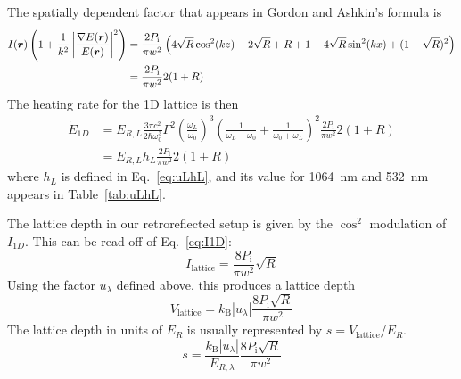 The spatially dependent factor that appears in Gordon and Ashkin's formula is
\begin{equation}
\begin{split}
   I(\bm{r}) 
  \left( 1 + \frac{1}{k^{2}}
    \left| 
   \frac{ \nabla E(\bm{r}) }
        {  E(\bm{r})} 
    \right|^{2} \right) & =  
   \frac{2 P_{\text{i}}}{\pi w^{2}} \left(
   4\sqrt{R}\cos^{2}(kz) - 2\sqrt{R} +R+1 
  + 
      4\sqrt{R} \sin^{2}(kx) +(1-\sqrt{R})^{2} 
  \right)  \\ 
   & =  
   \frac{2 P_{\text{i}}}{\pi w^{2}} 2 ( 1+R)
\end{split} 
\end{equation}
The heating rate for the 1D lattice is then
\begin{equation}
\begin{split}
  \dot{E}_{1D} & =  
   E_{R,L} 
   \frac{3\pi c^{2}}{2\hbar \omega_{0}^{3} } \Gamma^{2}
    \left( \frac{ \omega_{L} }{ \omega_{0}} \right)^{3} 
    \left(  \frac{1}{\omega_{L}-\omega_{0}} 
           + \frac{1}{\omega_{0} + \omega_{L}}  \right)^{2} 
   \frac{2 P_{\text{i}}}{\pi w^{2}} 2 ( 1+R) \\
    & = E_{R,L} h_{L}  
   \frac{2 P_{\text{i}}}{\pi w^{2}} 2 ( 1+R)  	 
\end{split}
\end{equation}
where $h_{L}$ is defined in Eq.~\ref{eq:uLhL}, and its value for 1064~nm and
532~nm appears in Table~\ref{tab:uLhL}. 


The lattice depth in our retroreflected setup is given by the $\cos^{2}$
modulation of $I_{1D}$.  This can be read off of Eq.~\ref{eq:I1D}:
\begin{equation}
  I_{\text{lattice}} = \frac{ 8 P_{\text{i}}}{\pi w^{2}} \sqrt{R} 
\end{equation}
Using the factor $u_{\lambda}$ defined above, this produces a  lattice depth
\begin{equation} 
  V_{\text{lattice}} =  k_{\text{B}} |u_{\lambda}|  
   \frac{ 8 P_{\text{i}}\sqrt{R}}{\pi w^{2}}
\end{equation}
The lattice depth in units of $E_{R}$ is usually represented by $s =
V_{\text{lattice}}/E_{R}$.    
\begin{equation}
  s =  
 \frac{k_{\text{B}}|u_{\lambda}|}{E_{R,\lambda}} 
  \frac{ 8 P_{\text{i}} \sqrt{R} }{\pi w^{2}}
 \label{eq:slatt} 
\end{equation}


